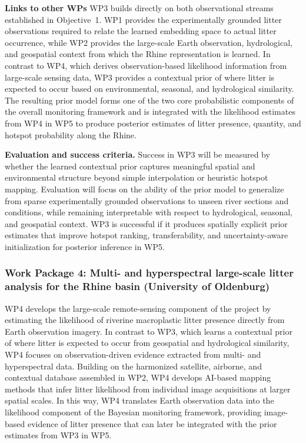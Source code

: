 \documentclass{scrartcl}
\begin{document}
\textbf{Links to other WPs} WP3 builds directly on both observational streams established in Objective~1. WP1 provides the experimentally grounded litter observations required to relate the learned embedding space to actual litter occurrence, while WP2 provides the large-scale Earth observation, hydrological, and geospatial context from which the Rhine representation is learned. In contrast to WP4, which derives observation-based likelihood information from large-scale sensing data, WP3 provides a contextual prior of where litter is expected to occur based on environmental, seasonal, and hydrological similarity. The resulting prior model forms one of the two core probabilistic components of the overall monitoring framework and is integrated with the likelihood estimates from WP4 in WP5 to produce posterior estimates of litter presence, quantity, and hotspot probability along the Rhine.

\textbf{Evaluation and success criteria.} Success in WP3 will be measured by whether the learned contextual prior captures meaningful spatial and environmental structure beyond simple interpolation or heuristic hotspot mapping. Evaluation will focus on the ability of the prior model to generalize from sparse experimentally grounded observations to unseen river sections and conditions, while remaining interpretable with respect to hydrological, seasonal, and geospatial context. WP3 is successful if it produces spatially explicit prior estimates that improve hotspot ranking, transferability, and uncertainty-aware initialization for posterior inference in WP5.


\subsubsection{Work Package 4: Multi- and hyperspectral large-scale litter analysis for the Rhine basin (University of Oldenburg)}

WP4 develops the large-scale remote-sensing component of the project by estimating the likelihood of riverine macroplastic litter presence directly from Earth observation imagery. In contrast to WP3, which learns a contextual prior of where litter is expected to occur from geospatial and hydrological similarity, WP4 focuses on observation-driven evidence extracted from multi- and hyperspectral data. Building on the harmonized satellite, airborne, and contextual database assembled in WP2, WP4 develops AI-based mapping methods that infer litter likelihood from individual image acquisitions at larger spatial scales. In this way, WP4 translates Earth observation data into the likelihood component of the Bayesian monitoring framework, providing image-based evidence of litter presence that can later be integrated with the prior estimates from WP3 in WP5.
\end{document}
